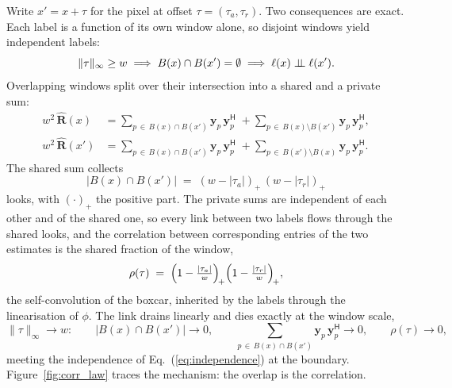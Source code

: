 Write $x' = x + \tau$ for the pixel at offset $\tau = (\tau_a, \tau_r)$. Two consequences are exact. Each label is a function of its own window alone, so disjoint windows yield independent labels:
\begin{equation}
  \lVert\tau\rVert_\infty \ge w
  \;\Longrightarrow\;
  B(x) \cap B(x') = \emptyset
  \;\Longrightarrow\;
  \ell(x) \perp\!\!\!\perp \ell(x').
  \label{eq:independence}
\end{equation}
Overlapping windows split over their intersection into a shared and a private sum:
\begin{align}
  w^2\,\hat{\mathbf{R}}(x)  &= \sum_{p \,\in\, B(x) \cap B(x')} \mathbf{y}_p\,\mathbf{y}_p^{\mathsf{H}} \;+ \sum_{p \,\in\, B(x) \setminus B(x')} \mathbf{y}_p\,\mathbf{y}_p^{\mathsf{H}},
  \label{eq:shared_private}\\
  w^2\,\hat{\mathbf{R}}(x') &= \sum_{p \,\in\, B(x) \cap B(x')} \mathbf{y}_p\,\mathbf{y}_p^{\mathsf{H}} \;+ \sum_{p \,\in\, B(x') \setminus B(x)} \mathbf{y}_p\,\mathbf{y}_p^{\mathsf{H}}.
\end{align}
The shared sum collects
\begin{equation}
  \bigl|B(x) \cap B(x')\bigr| \;=\; (w - |\tau_a|)_+\,(w - |\tau_r|)_+
  \label{eq:shared_count}
\end{equation}
looks, with $(\cdot)_+$ the positive part. The private sums are independent of each other and of the shared one, so every link between two labels flows through the shared looks, and the correlation between corresponding entries of the two estimates is the shared fraction of the window,
\begin{equation}
  \rho(\tau) \;=\; \Bigl(1 - \tfrac{|\tau_a|}{w}\Bigr)_{\!+}\Bigl(1 - \tfrac{|\tau_r|}{w}\Bigr)_{\!+},
  \label{eq:triangle}
\end{equation}
the self-convolution of the boxcar, inherited by the labels through the linearisation of $\phi$. The link drains linearly and dies exactly at the window scale,
\begin{equation}
  \lVert\tau\rVert_\infty \to w:
  \qquad
  \bigl|B(x) \cap B(x')\bigr| \to 0,
  \qquad
  \sum_{p \,\in\, B(x) \cap B(x')} \mathbf{y}_p\,\mathbf{y}_p^{\mathsf{H}} \to 0,
  \qquad
  \rho(\tau) \to 0,
  \label{eq:drain}
\end{equation}
meeting the independence of Eq.~(\ref{eq:independence}) at the boundary. Figure~\ref{fig:corr_law} traces the mechanism: the overlap is the correlation.

